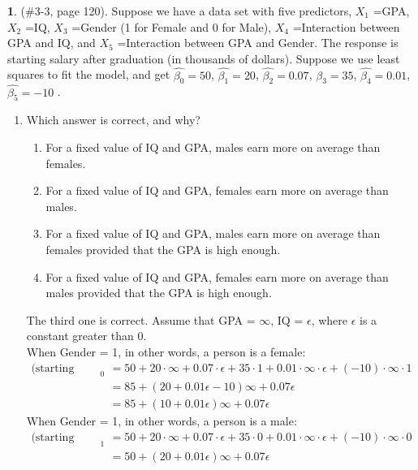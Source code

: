 \documentclass[12pt,fleqn]{article}\usepackage[]{graphicx}\usepackage[]{color}
\theoremstyle{definition}
\newtheorem{problem}{}
\begin{document}
	\begin{problem} (\#3-3, page 120). Suppose we have a data set with five predictors, $X_1$ =GPA, $X_2$ =IQ, $X_3$ =Gender (1 for Female and 0 for Male), $X_4$ =Interaction between GPA and IQ, and $X_5$ =Interaction between GPA and Gender. The response is starting salary after graduation (in thousands of dollars). Suppose we use least squares to fit the model, and get $\hat{\beta_0} = 50$, $\hat{\beta_1} = 20$, $\hat{\beta_2} = 0.07$, $\hat{\beta_3} = 35$, $\hat{\beta_4} = 0.01$, $\hat{\beta_5} = -10$ .
    \begin{enumerate}
  			\item Which answer is correct, and why?
  			  \begin{enumerate}
  			    \item For a fixed value of IQ and GPA, males earn more on average than females.
  			    \item For a fixed value of IQ and GPA, females earn more on average than males.
  			    \item For a fixed value of IQ and GPA, males earn more on average than females provided that the GPA is high enough.
  			    \item For a fixed value of IQ and GPA, females earn more on average than males provided that the GPA is high enough.
  			  \end{enumerate}
  			  The third one is correct. Assume that GPA = $\infty$, IQ = $\epsilon$, where $\epsilon$ is a constant greater than 0.\\
  			  When Gender = 1, in other words, a person is a female:
  			  \begin{align*}
  			    \mbox{(starting salary)}_0 &= 50 + 20\cdot \infty + 0.07\cdot \epsilon + 35\cdot 1 + 0.01\cdot \infty \cdot \epsilon + (-10) \cdot \infty \cdot 1\\
  			                           &= 85 + (20 + 0.01\epsilon - 10)\infty + 0.07\epsilon\\
  			                           &= 85 + (10 + 0.01\epsilon)\infty + 0.07\epsilon
  			  \end{align*}
  			  When Gender = 1, in other words, a person is a male:
  			  \begin{align*}
  			    \mbox{(starting salary)}_1 &= 50 + 20\cdot \infty + 0.07\cdot \epsilon + 35\cdot 0 + 0.01\cdot \infty \cdot \epsilon + (-10) \cdot \infty \cdot 0\\
  			                           &= 50 + (20 + 0.01\epsilon)\infty + 0.07\epsilon
  			  \end{align*}

\end{enumerate}
\end{problem}
\end{document}
